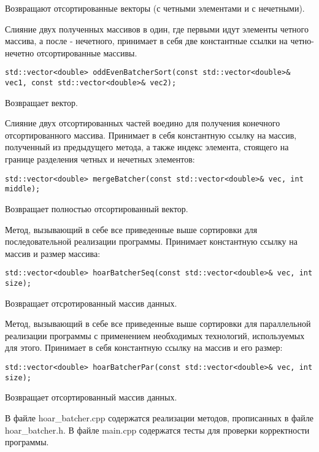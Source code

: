 \documentclass{report}
\begin{document}
\par Возвращают отсортированные векторы (с четными элементами и с нечетными).
\par Слияние двух полученных массивов в один, где первыми идут элементы четного массива, а после - нечетного, принимает в себя две константные ссылки на четно-нечетно отсортированные массивы.
\begin{lstlisting}
std::vector<double> oddEvenBatcherSort(const std::vector<double>& vec1, const std::vector<double>& vec2);
\end{lstlisting}
\par Возвращает вектор.
\par Слияние двух отсортированных частей воедино для получения конечного отсортированного массива. Принимает в себя константную ссылку на массив, полученный из предыдущего метода, а также индекс элемента, стоящего на границе разделения четных и нечетных элементов:
\begin{lstlisting}
std::vector<double> mergeBatcher(const std::vector<double>& vec, int middle);
\end{lstlisting}
\par Возвращает полностью отсортированный вектор.
\par Метод, вызывающий в себе все приведенные выше сортировки для последовательной реализации программы. Принимает константную ссылку на массив и размер массива:
\begin{lstlisting}
std::vector<double> hoarBatcherSeq(const std::vector<double>& vec, int size);
\end{lstlisting}
\par Возвращает отсротированный массив данных.
\par Метод, вызывающий в себе все приведенные выше сортировки для параллельной реализации программы с применением необходимых технологий, используемых для этого. Принимает в себя константную ссылку на массив и его размер:
\begin{lstlisting}
std::vector<double> hoarBatcherPar(const std::vector<double>& vec, int size);
\end{lstlisting}
\par Возвращает отсортированный массив данных.
\par В файле hoar\_batcher.cpp содержатся реализации методов, прописанных в файле hoar\_batcher.h. В файле main.cpp содержатся тесты для проверки корректности программы.
\newpage

\end{document}
